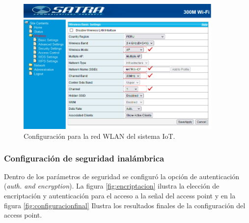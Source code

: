 \begin{figure}[htpb]
\centering 
\includegraphics[width=0.9\textwidth]{./Figures/configuracionancho.png}
\caption{Configuración para la red WLAN del sistema IoT.}
\label{fig:configuracionancho}
\end{figure}

\subsubsection{Configuración de seguridad inalámbrica}
Dentro de los parámetros de seguridad se configuró la opción de autenticación (\emph{auth. and encryption}). La figura \ref{fig:encriptacion} ilustra la elección de encriptación y autenticación para el acceso a la señal del access point y en la figura \ref{fig:configuracionfinal} Ilustra los resultados finales de la configuración del access point.

